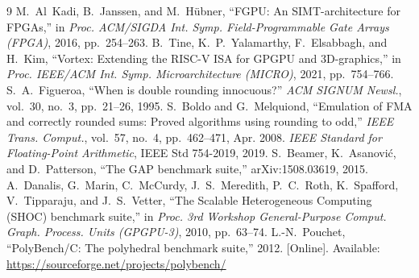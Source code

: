 \documentclass[journal]{IEEEtran}
\begin{document}
\begin{thebibliography}{9}
 M.~Al~Kadi, B.~Janssen, and M.~H\"ubner, ``FGPU: An
SIMT-architecture for FPGAs,'' in \emph{Proc. ACM/SIGDA Int. Symp.
Field-Programmable Gate Arrays (FPGA)}, 2016, pp.~254--263.
 B.~Tine, K.~P.~Yalamarthy, F.~Elsabbagh, and H.~Kim,
``Vortex: Extending the RISC-V ISA for GPGPU and 3D-graphics,'' in
\emph{Proc. IEEE/ACM Int. Symp. Microarchitecture (MICRO)}, 2021, pp.~754--766.
 S.~A.~Figueroa, ``When is double rounding innocuous?''
\emph{ACM SIGNUM Newsl.}, vol.~30, no.~3, pp.~21--26, 1995.
 S.~Boldo and G.~Melquiond, ``Emulation of FMA and correctly rounded
sums: Proved algorithms using rounding to odd,'' \emph{IEEE Trans. Comput.}, vol.~57,
no.~4, pp.~462--471, Apr. 2008.
 \emph{IEEE Standard for Floating-Point Arithmetic}, IEEE Std
754-2019, 2019.
 S.~Beamer, K.~Asanovi\'c, and D.~Patterson, ``The GAP benchmark suite,''
arXiv:1508.03619, 2015.
 A.~Danalis, G.~Marin, C.~McCurdy, J.~S.~Meredith, P.~C.~Roth, K.~Spafford,
V.~Tipparaju, and J.~S.~Vetter, ``The Scalable Heterogeneous Computing (SHOC) benchmark
suite,'' in \emph{Proc. 3rd Workshop General-Purpose Comput. Graph. Process. Units
(GPGPU-3)}, 2010, pp.~63--74.
 L.-N.~Pouchet, ``PolyBench/C: The polyhedral benchmark suite,''
2012. [Online]. Available: \url{https://sourceforge.net/projects/polybench/}
\end{thebibliography}
\end{document}
